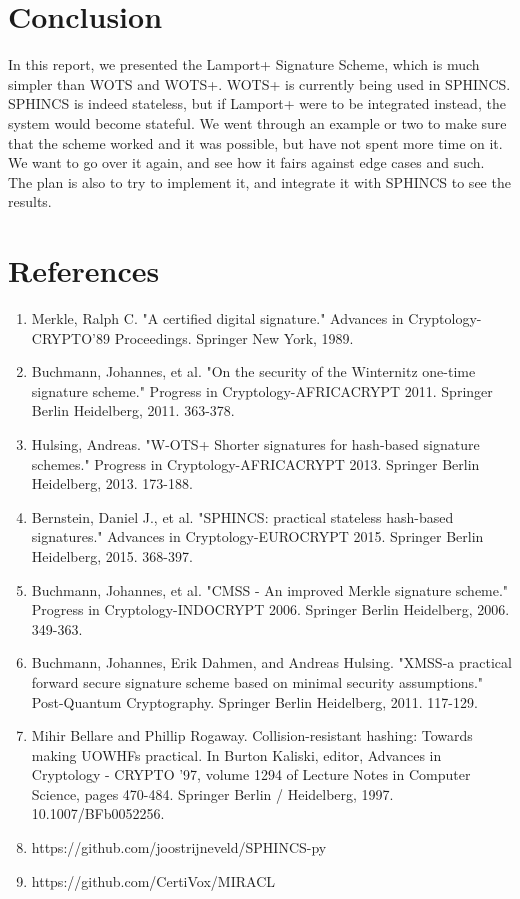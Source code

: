 \documentclass[]{scrartcl}
\begin{document}
\section*{Conclusion}
In this report, we presented the Lamport+ Signature Scheme, which is much simpler than WOTS and WOTS+. WOTS+ is currently being used in SPHINCS. SPHINCS is indeed stateless, but if Lamport+ were to be integrated instead, the system would become stateful. We went through an example or two to make sure that the scheme worked and it was possible, but have not spent more time on it. We want to go over it again, and see how it fairs against edge cases and such. The plan is also to try to implement it, and integrate it with SPHINCS to see the results.

\section*{References}
\begin{enumerate}
	\item Merkle, Ralph C. "A certified digital signature." Advances in Cryptology-CRYPTO'89 Proceedings. Springer New York, 1989.
	\item Buchmann, Johannes, et al. "On the security of the Winternitz one-time signature scheme." Progress in Cryptology-AFRICACRYPT 2011. Springer Berlin Heidelberg, 2011. 363-378.
	\item Hulsing, Andreas. "W-OTS+ Shorter signatures for hash-based signature schemes." Progress in Cryptology-AFRICACRYPT 2013. Springer Berlin Heidelberg, 2013. 173-188.
	\item Bernstein, Daniel J., et al. "SPHINCS: practical stateless hash-based signatures." Advances in Cryptology-EUROCRYPT 2015. Springer Berlin Heidelberg, 2015. 368-397.
	\item Buchmann, Johannes, et al. "CMSS - An improved Merkle signature scheme." Progress in Cryptology-INDOCRYPT 2006. Springer Berlin Heidelberg, 2006. 349-363.
	\item Buchmann, Johannes, Erik Dahmen, and Andreas Hulsing. "XMSS-a practical forward secure signature scheme based on minimal security assumptions." Post-Quantum Cryptography. Springer Berlin Heidelberg, 2011. 117-129.
	\item Mihir Bellare and Phillip Rogaway. Collision-resistant hashing: Towards making UOWHFs practical. In Burton Kaliski, editor, Advances in Cryptology - CRYPTO '97, volume 1294 of Lecture Notes in Computer Science, pages 470-484. Springer Berlin / Heidelberg, 1997. 10.1007/BFb0052256.
	\item https://github.com/joostrijneveld/SPHINCS-py
	\item https://github.com/CertiVox/MIRACL
\end{enumerate}
\end{document}
